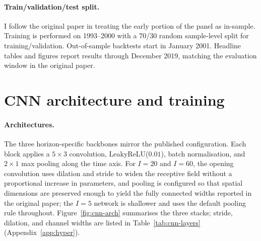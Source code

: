 \documentclass{article}
\begin{document}
\paragraph{Train/validation/test split.}
I follow the original paper in treating the early portion of
the panel as in-sample. Training is performed on 1993--2000 with a
70/30 random sample-level split for training/validation. Out-of-sample backtests start in January 2001. Headline tables and figures
report results through December 2019, matching the evaluation window in
the original paper.


\section{CNN architecture and training}
\label{sec:arch}

\paragraph{Architectures.}
The three horizon-specific backbones mirror the published configuration.
Each block applies a $5\times3$ convolution, LeakyReLU($0.01$), batch
normalisation, and $2\times1$ max pooling along the time axis. For
$I=20$ and $I=60$, the opening convolution uses dilation and stride to widen
the receptive field without a proportional increase in parameters, and
pooling is configured so that spatial dimensions are preserved enough to
yield the fully connected widths reported in the original paper; the
$I=5$ network is shallower and uses the default pooling rule throughout.
Figure~\ref{fig:cnn-arch} summarises the three stacks; stride, dilation,
and channel widths are listed in Table~\ref{tab:cnn-layers}
(Appendix~\ref{app:hyper}).
\end{document}
